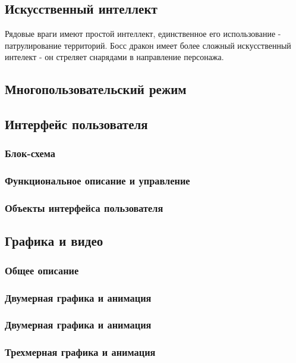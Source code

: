 \documentclass{article}
\begin{document}
\subsection{Искусственный интеллект}
Рядовые враги имеют простой интеллект, единственное его использование - патрулирование территорий. Босс дракон имеет более сложный искусственный интелект - он стреляет снарядами в направление персонажа.

\subsection{Многопользовательский режим}

\subsection{Интерфейс пользователя}
\subsubsection{Блок-схема}

\subsubsection{Функциональное описание и управление}

\subsubsection{Объекты интерфейса пользователя}

\subsection{Графика и видео}
\subsubsection{Общее описание}
\subsubsection{Двумерная графика и анимация}
\subsubsection{Двумерная графика и анимация}
\subsubsection{Трехмерная графика и анимация}
\end{document}
